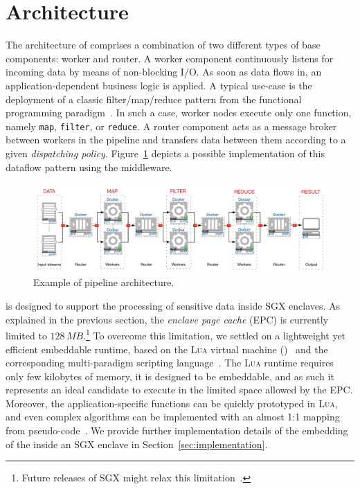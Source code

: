\section{Architecture}\label{sec:architecture}

The architecture of \SYS{} comprises a combination of two different types of base components: \textsf{worker} and \textsf{router}.
A \textsf{worker} component continuously listens for incoming data by means of non-blocking I/O.
As soon as data flows in, an application-dependent business logic is applied.
A typical use-case is the deployment of a classic filter/map/reduce pattern from the functional programming paradigm~\cite{bird_introduction_1988}.
In such a case, worker nodes execute only one function, namely \texttt{map}, \texttt{filter}, or \texttt{reduce}.
A \textsf{router} component acts as a message broker between workers in the pipeline and transfers data between them according to a given \emph{dispatching policy}.
Figure~\ref{fig:architecture_pipeline} depicts a possible implementation of this dataflow pattern using the \SYS{} middleware.

\begin{figure}[!t]
  \centering
  \includegraphics[width=\linewidth]{images/architecture_pipeline}
  \caption{Example of \SYS{} pipeline architecture.}
  \label{fig:architecture_pipeline}
\end{figure}


\SYS{} is designed to support the processing of sensitive data inside SGX enclaves.
As explained in the previous section, the \emph{enclave page cache} (EPC) is currently limited to $128\,\mathit{MB}$.\footnote{Future releases of SGX might relax this limitation~\cite{mckeen2016intel}.}
To overcome this limitation, we settled on a lightweight yet efficient embeddable runtime, based on the \textsc{Lua} virtual machine (\luavm)~\cite{ierusalimschy_luaextensible_1996} and the corresponding multi-paradigm scripting language~\cite{lualang}.
The \textsc{Lua} runtime requires only few kilobytes of memory, it is designed to be embeddable, and as such it represents an ideal candidate to execute in the limited space allowed by the EPC.
Moreover, the application-specific functions can be quickly prototyped in \textsc{Lua}, and even complex algorithms can be implemented with an almost 1:1 mapping from pseudo-code~\cite{leonini2009splay}.
We provide further implementation details of the embedding of the \luavm inside an SGX enclave in Section~\ref{sec:implementation}.

